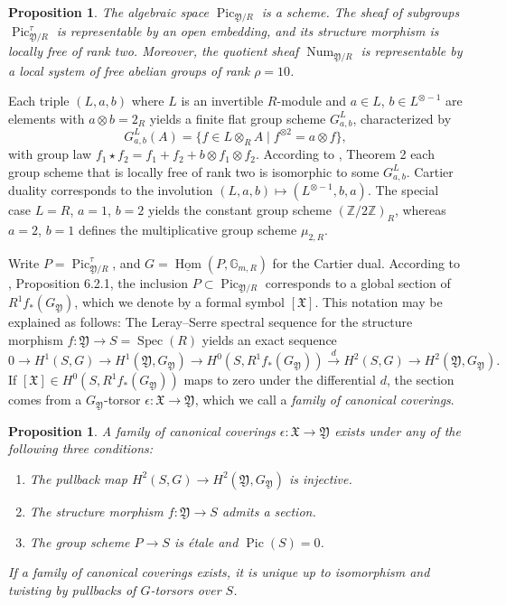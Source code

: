 \documentclass[oneside, 12pt]{amsart}
\newcommand\mylabel[1]{\label{#1}\marginpar{\vspace{-1ex}\medskip\medskip\footnotesize \tt #1}}
\renewcommand\mylabel[1]{\label{#1}}
\newtheorem{proposition}[theorem]{Proposition}
\theoremstyle{definition}
\theoremstyle{remark}
\newcommand{\ZZ}{\mathbb{Z}}
\newcommand{\GG}{\mathbb{G}}
\newcommand{\foX}{\mathfrak{X}}
\newcommand{\foY}{\mathfrak{Y}}
\newcommand{\Num}{\operatorname{Num}}
\newcommand{\Pic}{\operatorname{Pic}}
\newcommand{\ra}{\rightarrow}
\newcommand{\Spec}{\operatorname{Spec}}
\newcommand{\uHom}{\underline{\operatorname{Hom}}}
\begin{document}
\begin{proposition}
The algebraic space $\Pic_{\foY/R}$ is a scheme.
The sheaf of subgroups $\Pic^\tau_{\foY/R}$ is representable by an open embedding,
and its structure morphism  is  locally free of rank  two. 
Moreover, the     quotient sheaf $\Num_{\foY/R}$ is representable by a local system of free abelian groups of rank $\rho=10$.
\end{proposition}
 
Each triple $(L,a,b)$ where $L$ is an invertible $R$-module and $a\in L$, $b\in L^{\otimes -1}$ are
elements with $a\otimes b=2_R$ yields a finite flat group scheme $G^L_{a,b}$, characterized by
$$
G^L_{a,b}(A)=\{f\in L\otimes_RA\mid f^{\otimes 2}=a\otimes f \},
$$
with group law $f_1\star f_2=f_1+f_2+ b\otimes  f_1\otimes   f_2$.  
According to \cite{Tate; Oort 1970}, Theorem 2 each 
group scheme that is locally free of rank two is isomorphic to some $G^L_{a,b}$. Cartier duality corresponds
to the involution $(L,a,b)\mapsto (L^{\otimes -1},b,a)$.
The special case $L=R$, $a=1$, $b=2$ yields the constant group scheme $(\ZZ/2\ZZ)_R$,
whereas $a=2$, $b=1$ defines the multiplicative group scheme $\mu_{2,R}$.

Write $P=\Pic^\tau_{\foY/R}$,   and   $G=\uHom(P,\GG_{m,R})$ for the Cartier dual.
According to \cite{Raynaud 1970}, Proposition 6.2.1, the inclusion $P\subset\Pic_{\foY/R}$ corresponds to a global section
of $R^1f_*(G_\foY)$, which we denote by a formal symbol $[\foX]$. This  notation may  be explained as follows:
 The Leray--Serre spectral sequence for the structure morphism $f:\foY\ra S=\Spec(R)$
yields an exact sequence
\begin{equation}
\label{5-term sequence}
0\ra H^1(S, G)\ra H^1(\foY,G_\foY)\ra H^0(S,R^1f_*(G_\foY))\stackrel{d}{\ra} H^2(S,G)\ra H^2(\foY,G_\foY).
\end{equation}
If $[\foX]\in H^0(S,R^1f_*(G_\foY))$ maps to zero under the differential $d$, the section comes
from a $G_\foY$-torsor $\epsilon:\foX\ra \foY$, which we call a \emph{family of canonical coverings}. 

\begin{proposition}
\mylabel{canonical covering}
A family of canonical coverings $\epsilon:\foX\ra\foY$ exists 
under any of the following three conditions:
\begin{enumerate}
\item The pullback map $H^2(S,G)\ra H^2(\foY,G_\foY)$ is injective.
\item The   structure morphism $f:\foY\ra S$ admits a section.
\item The group scheme $P\ra S$ is \'etale and $\Pic(S)=0$.
\end{enumerate}
If a family of canonical coverings exists,  it is unique up to isomorphism and twisting by  pullbacks of $G$-torsors over $S$.
\end{proposition}
\end{document}
